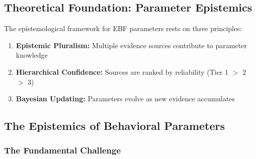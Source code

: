 \begin{abstract}
This appendix provides the methodological foundations for parameter estimation
in the EBF framework. We address the fundamental question: \textit{Where do
the numbers come from?} We present a three-tier hybrid estimation strategy that
integrates hard empirical data, meta-analytical calibration, and synthetic priors
from large language models. The appendix serves as the central ``Estimation Hub''
connecting Appendix LLM1 (LLM Monte Carlo), Appendix UNMAPPED_OPS (Empirical Operationalization),
and Chapter 4 (Calibration).
\end{abstract}

\subsection{Theoretical Foundation: Parameter Epistemics}
\label{sec:BBB-theory}

The epistemological framework for EBF parameters rests on three principles:

\begin{enumerate}
    \item \textbf{Epistemic Pluralism:} Multiple evidence sources contribute to parameter knowledge
    \item \textbf{Hierarchical Confidence:} Sources are ranked by reliability (Tier 1 $>$ 2 $>$ 3)
    \item \textbf{Bayesian Updating:} Parameters evolve as new evidence accumulates
\end{enumerate}

\subsection{The Epistemics of Behavioral Parameters}
\label{sec:BBB-epistemics}

\subsubsection{The Fundamental Challenge}

